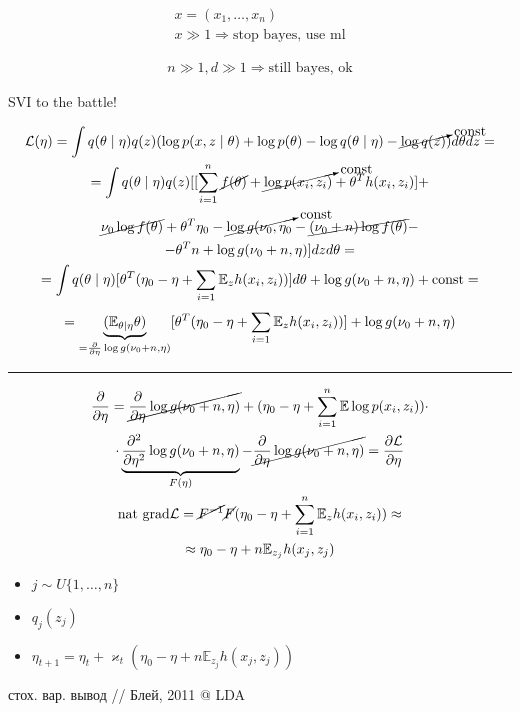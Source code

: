 \documentclass{book}
\begin{document}
\begin{gather*}
    x=(x_1,\dots,x_n)\\
    x \gg 1 \Rightarrow \textrm{stop bayes, use ml}
\end{gather*}

\begin{gather*}
  n\gg 1, d\gg 1 \Rightarrow \textrm{still bayes, ok}
\end{gather*}

SVI to the battle!

\begin{gather*}
    \mathcal{L}(\eta)=\int {q(\theta\mid \eta)q(z)(\log p(x,z\mid \theta)+\log p(\theta)-\log q(\theta\mid \eta)-\cancelto{\mathrm{const}}{\log q(z)})d\theta dz}=\\
    =\int {q(\theta\mid \eta)q(z)[[\sum_{i=1}^{n} \cancel{f(\theta)}+\cancelto{\mathrm{const}}{\log p(x_i,z_i)}+\theta^Th(x_i,z_i)]}+\\
    \cancel{\nu_0\log f(\theta)}+\theta^T\eta_0-\cancelto{\mathrm{const}}{\log g(\nu_0,\eta_0}-\cancel{(\nu_0+n)\log f(\theta)}-\\
    -\theta^Tn+\log g(\nu_0+n,\eta)]dzd\theta=\\
    =\int {q(\theta\mid \eta)[\theta^T(\eta_0-\eta+\sum_{i=1}^{} {\mathbb{E}_zh(x_i,z_i))]}d\theta}+\log g(\nu_0+n,\eta)+\mathrm{const}=\\
    =\underbrace{(\mathbb{E}_{\theta\mid \eta}\theta)}_{=\frac{\partial }{\partial \eta}\log g(\nu_0+n,\eta)}[\theta^T(\eta_0-\eta+\sum_{i=1}^{} {\mathbb{E}_zh(x_i,z_i)})]+\log g(\nu_0+n,\eta)
\end{gather*}

\hrule

\begin{gather*}
    \frac{\partial }{\partial \eta}=\cancel{\frac{\partial }{\partial \eta}\log g(\nu_0+n,\eta)}+(\eta_0-\eta+\sum_{i=1}^{n} {\mathbb{E}\log p(x_i,z_i)})\cdot\\
    \cdot \underbrace{\frac{\partial ^2}{\partial \eta^2}\log g(\nu_0+n,\eta)}_{F(\eta)}-\cancel{\frac{\partial }{\partial \eta}\log g(\nu_0+n,\eta)}=\frac{\partial \mathcal{L}}{\partial \eta}\\
    \mathrm{nat~grad}\mathcal{L}=\cancel{F^{-1}}\cancel{F}(\eta_0-\eta+\sum_{i=1}^{n} {\mathbb{E}_zh(x_i,z_i)})\approx\\
    \approx \eta_0-\eta+n\mathbb{E}_{z_j}h(x_j,z_j)
\end{gather*}

\begin{itemize}
    \item $j \sim U\{1,\dots,n\}$
    \item  $q_j(z_j)$
    \item $\eta_{t+1}=\eta_t+\varkappa_t\left(\eta_0-\eta+n\mathbb{E}_{z_j}h(x_j,z_j)\right)$
\end{itemize}

стох. вар. вывод // Блей, 2011 @ LDA
\end{document}
